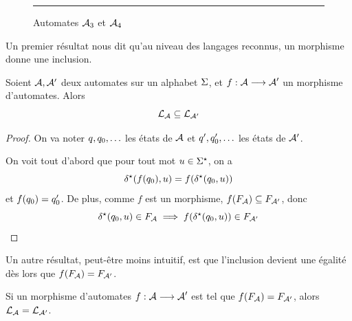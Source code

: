 \begin{figure}[t]
  \centering

  \vspace{0.2cm}
  \hrule

  \vspace{0.2cm}
  \caption{Automates $\mathcal{A}_3$ et $\mathcal{A}_4$}
  \label{fig.auto.3}
\end{figure}

Un premier résultat nous dit qu'au niveau des langages reconnus, un morphisme
donne une inclusion.

\begin{proposition}
  Soient $\mathcal{A}, \mathcal{A}'$ deux automates sur un alphabet $\Sigma$, et
  $f : \displaystyle \mathcal{A} \longrightarrow \mathcal{A}'$ un morphisme d'automates. Alors
  \[\mathcal L_{\mathcal{A}} \subseteq \mathcal L_{\mathcal{A}'}\]
\end{proposition}

\begin{proof}
  On va noter $q_{},q_{0},\ldots$ les états de $\mathcal{A}$ et
  $q_{}',q_{0}',\ldots$ les états de $\mathcal{A}'$.
  
  On voit tout d'abord que pour tout mot $u\in\Sigma^{\star}$, on a
  \[\delta_{}^{\star}(f(q_{0}),u) = f(\delta_{}^{\star}(q_{0},u))\]
  et $f(q_{0}) = q_{0}'$. De plus, comme $f$ est un morphisme,
  $f(F_{\mathcal{A}})\subseteq F_{\mathcal{A}'}$, donc
  \[\delta_{}^{\star}(q_{0},u)\in F_{\mathcal{A}}\implies f(\delta_{}^{\star}(q_{0},u))\in F_{\mathcal{A}'}
  \qedhere\]
\end{proof}

Un autre résultat, peut-être moins intuitif, est que l'inclusion devient une
égalité dès lors que $f(F_{\mathcal{A}}) = F_{\mathcal{A}'}$.

\begin{proposition}
  Si un morphisme d'automates $f : \displaystyle \mathcal{A} \longrightarrow \mathcal{A}'$ est tel que
  $f(F_{\mathcal{A}}) = F_{\mathcal{A}'}$, alors $\mathcal L_{\mathcal{A}} = \mathcal L_{\mathcal{A}'}$.
\end{proposition}

